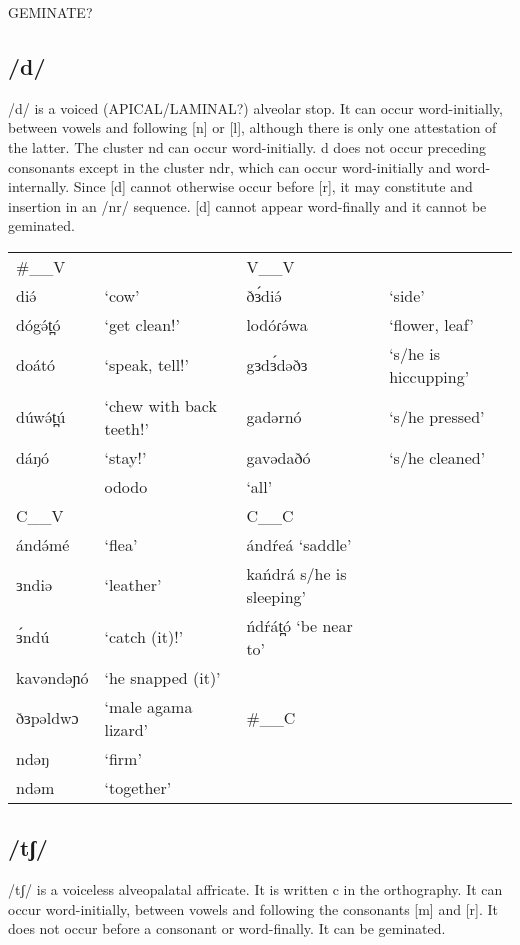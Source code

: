 GEMINATE?

\subsection{/d/}
/d/ is a voiced (APICAL/LAMINAL?) alveolar stop. It can occur word-initially, between vowels and following [n] or [l], although there is only one attestation of the latter. The cluster nd can occur word-initially. d does not occur preceding consonants except in the cluster ndr, which can occur word-initially and word-internally. Since [d] cannot otherwise occur before [r], it may constitute and insertion in an /nr/ sequence. [d] cannot appear word-finally and it cannot be geminated. 

\ea
\begin{supertabular}[t]{lllp{3cm}}
\#\_\_V	&&	V\_\_V	\\
diə́		&‘cow’					&ðɜ́diə́			&‘side’\\
dógə́t̪ó	&‘get clean!’			&lodóɾə́wa		&‘flower, leaf’\\
doátó	&‘speak, tell!’			&gɜdɜ́dəðɜ		&‘s/he is hiccupping’\\
dúwə́t̪ú	&‘chew with back teeth!’	&gadərnó		&‘s/he pressed’\\
dáŋó	&‘stay!’				&gavədaðó		&‘s/he cleaned’\\
								&ododo			&‘all’\\
\midrule	
C\_\_V	&&		C\_\_C	\\
\midrule
ándə́mé	&‘flea’				&ándŕeá		‘saddle’\\
ɜndiə	&‘leather’			&kańdrá	s/he is sleeping’\\
ɜ́ndú	&‘catch (it)!’		&ńdŕát̪ó	‘be near to’\\
kavəndəɲó	&‘he snapped (it)’		\\
ðɜpəldwɔ	&‘male agama lizard’	&	\#\_\_C	\\
ndəŋ	&‘firm’\\
ndəm	&‘together’\\
\end{supertabular}\label{ex:ch2:20}
\z 


\subsection{/tʃ/}
/tʃ/ is a voiceless alveopalatal affricate. It is written c  in the orthography. It can occur word-initially, between vowels and following the consonants [m] and [r]. It does not occur before a consonant or word-finally. It can be geminated.

